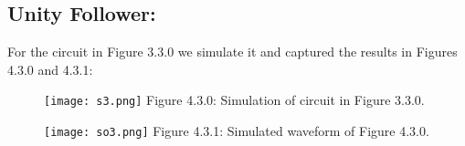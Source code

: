 \subsection{Unity Follower:}

For the circuit in Figure 3.3.0 we simulate it and captured the results in Figures 4.3.0 and 4.3.1:

\begin{figure}[H]
\texttt{[image: s3.png]}
\centering \linebreak \linebreak Figure 4.3.0: Simulation of circuit in Figure 3.3.0.
\end{figure} \hfill

\begin{figure}[H]
\texttt{[image: so3.png]}
\centering \linebreak \linebreak Figure 4.3.1: Simulated waveform of Figure 4.3.0.
\end{figure} \hfill

\pagebreak
